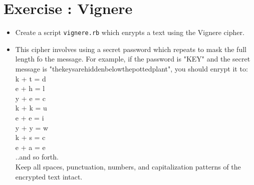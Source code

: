 \documentclass{42-en}
\begin{document}


\chapter{Exercise \exercicenumber: Vignere}

\exnumber{\exercicenumber}


\begin{itemize}

\item Create a script \texttt{vignere.rb} which enrypts a text using the Vignere cipher.
\item This cipher involves using a secret password which repeats to mask the full length fo the message. For example, if the password is "KEY" and the secret message is "thekeysarehiddenbelowthepottedplant", you should enrypt it to:
\\
k + t = d\\
e + h = l\\
y + e = c\\
k + k = u\\
e + e = i\\
y + y = w\\
k + s = c\\
e + a = e\\
..and so forth.\\

Keep all spaces, punctuation, numbers, and capitalization patterns of the encrypted text intact. 

\end{itemize}




\end{document}
